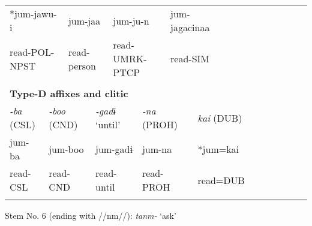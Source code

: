\begin{tabularx}{\textwidth}{XXXXXXXXXXXXXXXXXXXXXXX}
\multicolumn{4}{X}{{ *jum-jawu-i}} & \multicolumn{3}{X}{{ jum-jaa}} & \multicolumn{4}{X}{{ jum-ju-n}} & \multicolumn{4}{X}{{ jum-jagacinaa}} & \multicolumn{8}{X}{}\\
\multicolumn{4}{X}{read-POL-NPST} & \multicolumn{3}{X}{read-person} & \multicolumn{4}{X}{read-UMRK-PTCP} & \multicolumn{4}{X}{read-SIM} & \multicolumn{8}{X}{}\\
\multicolumn{23}{X}{}\\
\multicolumn{23}{X}{{\bfseries Type-D affixes and clitic}}\\
\multicolumn{2}{X}{{ \textit{{}-ba} (CSL)}} & \multicolumn{4}{X}{{ \textit{{}-boo} (CND)}} & \multicolumn{3}{X}{{ \textit{{}-gadɨ} ‘until’}} & \multicolumn{4}{X}{{ \textit{{}-na} (PROH)}} & \multicolumn{4}{X}{{ \textit{kai} (DUB)}} & \multicolumn{6}{X}{}\\
\multicolumn{2}{X}{{ jum-ba}} & \multicolumn{4}{X}{{ jum-boo}} & \multicolumn{3}{X}{{ jum-gadɨ}} & \multicolumn{4}{X}{{ jum-na}} & \multicolumn{4}{X}{{ *jum=kai}} & \multicolumn{6}{X}{}\\
\multicolumn{2}{X}{read-CSL} & \multicolumn{4}{X}{read-CND} & \multicolumn{3}{X}{read-until} & \multicolumn{4}{X}{read-PROH} & \multicolumn{4}{X}{read=DUB} & \multicolumn{6}{X}{}\\
\lspbottomrule
\end{tabularx}
Stem No. 6 (ending with //nm//): \textit{tanm-} ‘ask’

\tablefirsthead{}


